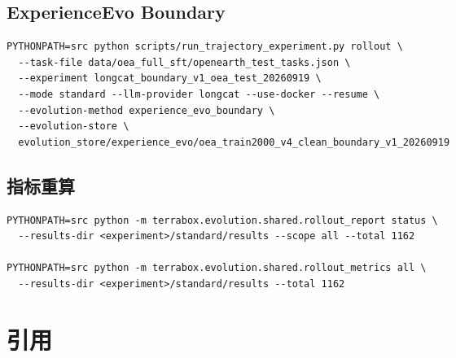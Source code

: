 \documentclass[a4paper,11pt]{article}
\begin{document}
\begin{CJK*}{UTF8}{gbsn}
\subsection{ExperienceEvo Boundary}

\begin{lstlisting}[basicstyle=\scriptsize\ttfamily,breaklines=true]
PYTHONPATH=src python scripts/run_trajectory_experiment.py rollout \
  --task-file data/oea_full_sft/openearth_test_tasks.json \
  --experiment longcat_boundary_v1_oea_test_20260919 \
  --mode standard --llm-provider longcat --use-docker --resume \
  --evolution-method experience_evo_boundary \
  --evolution-store \
  evolution_store/experience_evo/oea_train2000_v4_clean_boundary_v1_20260919
\end{lstlisting}

\subsection{指标重算}

\begin{lstlisting}[basicstyle=\scriptsize\ttfamily,breaklines=true]
PYTHONPATH=src python -m terrabox.evolution.shared.rollout_report status \
  --results-dir <experiment>/standard/results --scope all --total 1162

PYTHONPATH=src python -m terrabox.evolution.shared.rollout_metrics all \
  --results-dir <experiment>/standard/results --total 1162
\end{lstlisting}

\section{引用}




\end{CJK*}
\end{document}
